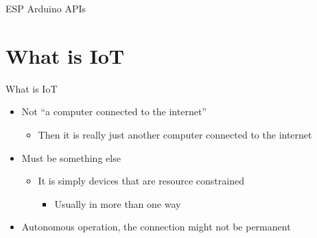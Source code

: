\begin{frame}[fragile]{ESP Arduino APIs}
\protect\hypertarget{esp-arduino-apis-1}{}

\begin{Shaded}
\begin{Highlighting}[]
\NormalTok{ \{}


\NormalTok{);}



\end{Highlighting}
\end{Shaded}


\end{frame}

\hypertarget{what-is-iot}{%
\section{What is IoT}\label{what-is-iot}}

\begin{frame}{What is IoT}
\protect\hypertarget{what-is-iot-1}{}

\begin{itemize}
\tightlist
\item
  Not “a computer connected to the internet”

  \begin{itemize}
  \tightlist
  \item
    Then it is really just another computer connected to the internet
  \end{itemize}
\item
  Must be something else

  \begin{itemize}
  \tightlist
  \item
    It is simply devices that are resource constrained

    \begin{itemize}
    \tightlist
    \item
      Usually in more than one way
    \end{itemize}
  \end{itemize}
\item
  Autonomous operation, the connection might not be permanent
\end{itemize}

\end{frame}

